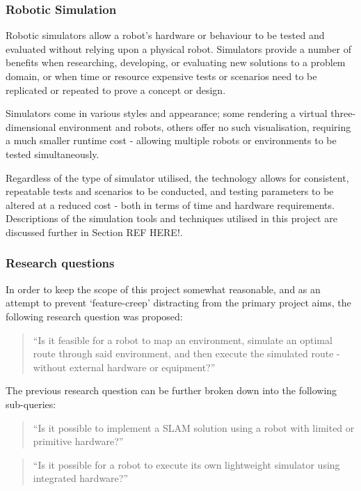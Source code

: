 \subsubsection{Robotic Simulation}
Robotic simulators allow a robot's hardware or behaviour to be tested and
evaluated without relying upon a physical robot.
Simulators provide a number of benefits when researching, developing, or
evaluating new solutions to a problem domain, or when time or resource
expensive tests or scenarios need to be replicated or repeated to prove a
concept or design.

Simulators come in various styles and appearance; some rendering a virtual
three-dimensional  environment and robots, others offer no such visualisation,
requiring a much smaller runtime cost - allowing multiple robots or
environments to be tested simultaneously.

Regardless of the type of simulator utilised, the technology allows for
consistent, repeatable tests and scenarios to be conducted, and testing
parameters to be altered at a reduced cost - both in terms of time and
hardware requirements.
Descriptions of the simulation tools and techniques utilised in this project
are discussed further in Section REF HERE!.


\subsubsection{Research questions} \label{sec_res_q}
In order to keep the scope of this project somewhat reasonable, and as an
attempt to prevent `feature-creep' distracting from the primary project aims,
the following research question was proposed:
\begin{quote}
    ``Is it feasible for a robot to map an environment, simulate an optimal
    route through said environment, and then execute the simulated route -
    without external hardware or equipment?''
\end{quote}

The previous research question can be further broken down into the following
sub-queries:

\begin{quote}
    ``Is it possible to implement a SLAM solution using a robot with limited or
    primitive hardware?''
\end{quote}

\begin{quote}
    ``Is it possible for a robot to execute its own lightweight simulator using
    integrated hardware?''
\end{quote}

